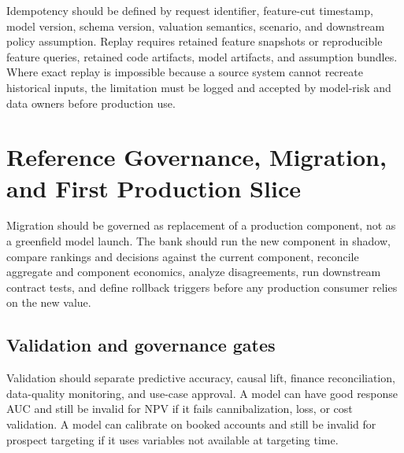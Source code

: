 \documentclass[11pt]{article}
\newcommand{\1}{\mathbf{1}}
\begin{document}
Idempotency should be defined by request identifier, feature-cut timestamp,
model version, schema version, valuation semantics, scenario, and downstream
policy assumption. Replay requires retained feature snapshots or reproducible
feature queries, retained code artifacts, model artifacts, and assumption
bundles. Where exact replay is impossible because a source system cannot
recreate historical inputs, the limitation must be logged and accepted by
model-risk and data owners before production use.

\section{Reference Governance, Migration, and First Production Slice}
\label{sec:governance-migration}

Migration should be governed as replacement of a production component, not as a
greenfield model launch. The bank should run the new component in shadow,
compare rankings and decisions against the current component, reconcile
aggregate and component economics, analyze disagreements, run downstream
contract tests, and define rollback triggers before any production consumer
relies on the new value.

\subsection{Validation and governance gates}
\label{subsec:validation-governance-gates}

Validation should separate predictive accuracy, causal lift, finance
reconciliation, data-quality monitoring, and use-case approval. A model can
have good response AUC and still be invalid for NPV if it fails
cannibalization, loss, or cost validation. A model can calibrate on booked
accounts and still be invalid for prospect targeting if it uses variables not
available at targeting time.
\end{document}
